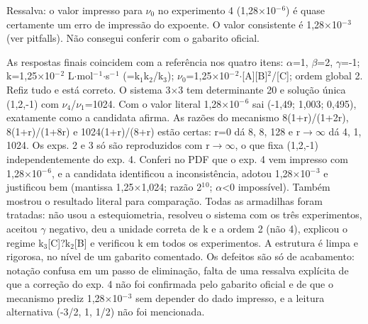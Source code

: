 \documentclass{article}%
\begin{document}
Ressalva: o valor impresso para $\nu$$_{0}$ no experimento 4 (1,28$\times$10$^{-}$$^{6}$) é quase certamente um erro de impressão do expoente. O valor consistente é 1,28$\times$10$^{-}$$^3$ (ver pitfalls). Não consegui conferir com o gabarito oficial.\par %
As respostas finais coincidem com a referência nos quatro itens: $\alpha$=1, $\beta$=2, $\gamma$=-1; k=1,25$\times$10$^{-}$$^2$ L$\cdot$mol$^{-}$$^{1}$$\cdot$s$^{-}$$^{1}$ (=k$_{1}$k$_{2}$/k$_{3}$); $\nu$$_{0}$=1,25$\times$10$^{-}$$^2$$\cdot${[}A{]}{[}B{]}$^2$/{[}C{]}; ordem global 2. Refiz tudo e está correto. O sistema 3$\times$3 tem determinante 20 e solução única (1,2,-1) com $\nu$$_{4}$/$\nu$$_{1}$=1024. Com o valor literal 1,28$\times$10$^{-}$$^{6}$ sai (-1,49; 1,003; 0,495), exatamente como a candidata afirma. As razões do mecanismo 8(1+r)/(1+2r), 8(1+r)/(1+8r) e 1024(1+r)/(8+r) estão certas: r=0 dá 8, 8, 128 e r$\to$$\infty$ dá 4, 1, 1024. Os exps. 2 e 3 só são reproduzidos com r$\to$$\infty$, o que fixa (1,2,-1) independentemente do exp. 4. Conferi no PDF que o exp. 4 vem impresso com 1,28$\times$10$^{-}$$^{6}$, e a candidata identificou a inconsistência, adotou 1,28$\times$10$^{-}$$^3$ e justificou bem (mantissa 1,25$\times$1,024; razão 2$^{1}$$^{0}$; $\alpha$<0 impossível). Também mostrou o resultado literal para comparação. Todas as armadilhas foram tratadas: não usou a estequiometria, resolveu o sistema com os três experimentos, aceitou $\gamma$ negativo, deu a unidade correta de k e a ordem 2 (não 4), explicou o regime k$_{3}${[}C{]}?k$_{2}${[}B{]} e verificou k em todos os experimentos. A estrutura é limpa e rigorosa, no nível de um gabarito comentado. Os defeitos são só de acabamento: notação confusa em um passo de eliminação, falta de uma ressalva explícita de que a correção do exp. 4 não foi confirmada pelo gabarito oficial e de que o mecanismo prediz 1,28$\times$10$^{-}$$^3$ sem depender do dado impresso, e a leitura alternativa (-3/2, 1, 1/2) não foi mencionada.%
$$
\end{document}

